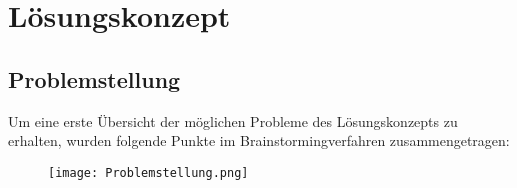 \section{Lösungskonzept} \label{sec:loesungskonzept}
\subsection{Problemstellung} \label{subsec:problemstellung}
Um eine erste Übersicht der möglichen Probleme des Lösungskonzepts zu erhalten, wurden folgende Punkte im Brainstormingverfahren zusammengetragen:
\begin{figure}[h]
	\centering
	\texttt{[image: Problemstellung.png]}
	\label{fig:Figure}
\end{figure}
\newpage















